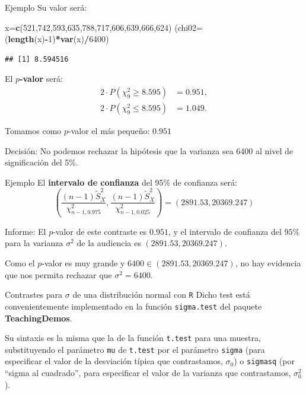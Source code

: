 \documentclass[
  ignorenonframetext,
]{beamer}
\newenvironment{Shaded}{\begin{snugshade}}{\end{snugshade}}
\newcommand{\DataTypeTok}[1]{\textcolor[rgb]{0.13,0.29,0.53}{#1}}
\newcommand{\DecValTok}[1]{\textcolor[rgb]{0.00,0.00,0.81}{#1}}
\newcommand{\KeywordTok}[1]{\textcolor[rgb]{0.13,0.29,0.53}{\textbf{#1}}}
\newcommand{\NormalTok}[1]{#1}
\newcommand{\OperatorTok}[1]{\textcolor[rgb]{0.81,0.36,0.00}{\textbf{#1}}}
\begin{document}
\begin{frame}[fragile]{Ejemplo}
\protect\hypertarget{ejemplo-20}{}
Su valor será:

\begin{Shaded}
\begin{Highlighting}[]
\NormalTok{x=}\KeywordTok{c}\NormalTok{(}\DecValTok{521}\NormalTok{,}\DecValTok{742}\NormalTok{,}\DecValTok{593}\NormalTok{,}\DecValTok{635}\NormalTok{,}\DecValTok{788}\NormalTok{,}\DecValTok{717}\NormalTok{,}\DecValTok{606}\NormalTok{,}\DecValTok{639}\NormalTok{,}\DecValTok{666}\NormalTok{,}\DecValTok{624}\NormalTok{)}
\NormalTok{(}\DataTypeTok{chi02=}\NormalTok{ (}\KeywordTok{length}\NormalTok{(x)}\OperatorTok{{-}}\DecValTok{1}\NormalTok{)}\OperatorTok{*}\KeywordTok{var}\NormalTok{(x)}\OperatorTok{/}\DecValTok{6400}\NormalTok{)}
\end{Highlighting}
\end{Shaded}

\begin{verbatim}
## [1] 8.594516
\end{verbatim}

El \textbf{\(p\)-valor} será: \[
\begin{array}{rl}
2\cdot P(\chi_9^2\geq 8.595) & =0.951,\\
2\cdot P(\chi_9^2\leq 8.595) &=1.049.
\end{array}
\]

Tomamos como \(p\)-valor el más pequeño: \(0.951\)

Decisión: No podemos rechazar la hipótesis que la varianza sea 6400 al
nivel de significación del 5\%.
\end{frame}

\begin{frame}{Ejemplo}
\protect\hypertarget{ejemplo-21}{}
El \textbf{intervalo de confianza} del 95\% de confianza será: \[
\left( \frac{(n-1)\widetilde{S}_{X}^2}{\chi_{n-1,0.975}^2},
\frac{(n-1)\widetilde{S}_{X}^2}{\chi_{n-1,0.025}^2}
\right)=(2891.53,20369.247)
\]

Informe: El \(p\)-valor de este contraste es \(0.951\), y el intervalo
de confianza del \(95\%\) para la varianza \(\sigma^2\) de la audiencia
es \((2891.53,20369.247)\).

Como el \(p\)-valor es muy grande y \(6400\in (2891.53,20369.247)\), no
hay evidencia que nos permita rechazar que \(\sigma^2=6400\).
\end{frame}

\begin{frame}[fragile]{Contrastes para \(\sigma\) de una distribución
normal con \texttt{R}}
\protect\hypertarget{contrastes-para-sigma-de-una-distribuciuxf3n-normal-con-r}{}
Dicho test está convenientemente implementado en la función
\texttt{sigma.test} del paquete \textbf{TeachingDemos}.

Su sintaxis es la misma que la de la función \texttt{t.test} para una
muestra, substituyendo el parámetro \texttt{mu} de \texttt{t.test} por
el parámetro \texttt{sigma} (para especificar el valor de la desviación
típica que contrastamos, \(\sigma_0\)) o \texttt{sigmasq} (por ``sigma
al cuadrado'', para especificar el valor de la varianza que
contrastamos, \(\sigma_0^2\)).
\end{frame}
\end{document}

